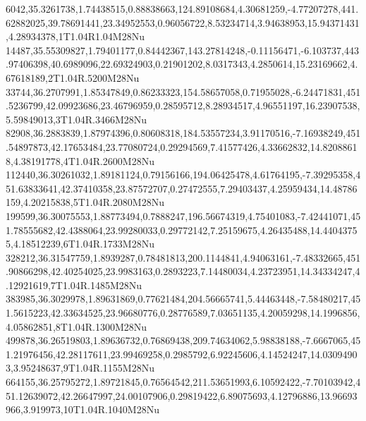 6042,35.3261738,1.74438515,0.88838663,124.89108684,4.30681259,-4.77207278,441.62882025,39.78691441,23.34952553,0.96056722,8.53234714,3.94638953,15.94371431,4.28934378,1T1.04R1.04M28Nu
14487,35.55309827,1.79401177,0.84442367,143.27814248,-0.11156471,-6.103737,443.97406398,40.6989096,22.69324903,0.21901202,8.0317343,4.2850614,15.23169662,4.67618189,2T1.04R.5200M28Nu
33744,36.2707991,1.85347849,0.86233323,154.58657058,0.71955028,-6.24471831,451.5236799,42.09923686,23.46796959,0.28595712,8.28934517,4.96551197,16.23907538,5.59849013,3T1.04R.3466M28Nu
82908,36.2883839,1.87974396,0.80608318,184.53557234,3.91170516,-7.16938249,451.54897873,42.17653484,23.77080724,0.29294569,7.41577426,4.33662832,14.82088618,4.38191778,4T1.04R.2600M28Nu
112440,36.30261032,1.89181124,0.79156166,194.06425478,4.61764195,-7.39295358,451.63833641,42.37410358,23.87572707,0.27472555,7.29403437,4.25959434,14.48786159,4.20215838,5T1.04R.2080M28Nu
199599,36.30075553,1.88773494,0.7888247,196.56674319,4.75401083,-7.42441071,451.78555682,42.4388064,23.99280033,0.29772142,7.25159675,4.26435488,14.44043755,4.18512239,6T1.04R.1733M28Nu
328212,36.31547759,1.8939287,0.78481813,200.1144841,4.94063161,-7.48332665,451.90866298,42.40254025,23.9983163,0.2893223,7.14480034,4.23723951,14.34334247,4.12921619,7T1.04R.1485M28Nu
383985,36.3029978,1.89631869,0.77621484,204.56665741,5.44463448,-7.58480217,451.5615223,42.33634525,23.96680776,0.28776589,7.03651135,4.20059298,14.1996856,4.05862851,8T1.04R.1300M28Nu
499878,36.26519803,1.89636732,0.76869438,209.74634062,5.98838188,-7.6667065,451.21976456,42.28117611,23.99469258,0.2985792,6.92245606,4.14524247,14.03094903,3.95248637,9T1.04R.1155M28Nu
664155,36.25795272,1.89721845,0.76564542,211.53651993,6.10592422,-7.70103942,451.12639072,42.26647997,24.00107906,0.29819422,6.89075693,4.12796886,13.96693966,3.919973,10T1.04R.1040M28Nu
